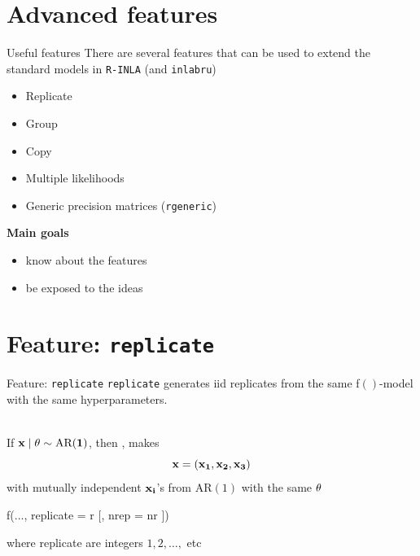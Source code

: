 \documentclass[
  ignorenonframetext,
]{beamer}
\newenvironment{Shaded}{\begin{snugshade}}{\end{snugshade}}
\newcommand{\AttributeTok}[1]{\textcolor[rgb]{0.77,0.63,0.00}{#1}}
\newcommand{\FunctionTok}[1]{\textcolor[rgb]{0.00,0.00,0.00}{#1}}
\newcommand{\NormalTok}[1]{#1}
\providecommand{\tightlist}{%
  \setlength{\itemsep}{0pt}\setlength{\parskip}{0pt}}
\begin{document}
\hypertarget{advanced-features}{%
\section{Advanced features}\label{advanced-features}}

\begin{frame}[fragile]{Useful features}
\protect\hypertarget{useful-features}{}
There are several features that can be used to extend the standard
models in \texttt{R-INLA} (and \texttt{inlabru})

\begin{itemize}
\item
  Replicate
\item
  Group
\item
  Copy
\item
  Multiple likelihoods
\item
  Generic precision matrices (\texttt{rgeneric})
\end{itemize}

\textbf{Main goals}

\begin{itemize}
\tightlist
\item
  know about the features
\item
  be exposed to the ideas
\end{itemize}
\end{frame}

\hypertarget{feature-replicate}{%
\section{\texorpdfstring{Feature:
\texttt{replicate}}{Feature: replicate}}\label{feature-replicate}}

\begin{frame}[fragile]{Feature: \texttt{replicate}}
\protect\hypertarget{feature-replicate-1}{}
\texttt{replicate} generates iid replicates from the same f\(()\)-model
with the same hyperparameters.\\
\strut \\
If \(\bf{x}\mid\bf{\theta} \sim \text{AR}(1)\), then ,
makes \[
\bf{x} = ({\bf x}_{1}, {\bf x}_{2}, {\bf x}_{3})
\] with mutually independent \(\bf{x}_{i}\)'s from AR\((1)\) with the
same \(\bf{\theta}\)

\begin{Shaded}
\begin{Highlighting}[]
    \FunctionTok{f}\NormalTok{(..., }\AttributeTok{replicate =}\NormalTok{ r [, }\AttributeTok{nrep =}\NormalTok{ nr ])}
\end{Highlighting}
\end{Shaded}

where replicate are integers \(1, 2, \ldots,\) etc
\end{frame}
\end{document}
